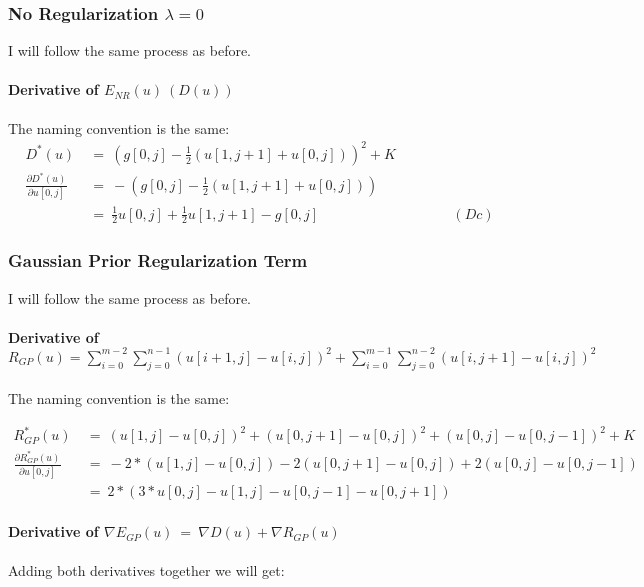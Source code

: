 \documentclass{report}
\begin{document}
			\subsubsection{No Regularization $\lambda = 0$}
			\startsubsection
				I will follow the same process as before.
				\vspace{-0.4cm} \paragraph{Derivative of  $E_{NR}(u) \ (D(u))$}
				\startsubsection
					The naming convention is the same:
					\vspace{-0.2cm}
					\begin{align*}
						D^*(u) \ & = \ (g[0,j] - \frac{1}{2} (u[1,j+1] + u[0,j]))^2 + K \\
						\frac{\partial D^*(u)}{\partial u[0,j]} \ & = \ - (g[0,j] - \frac{1}{2} (u[1,j+1] + u[0,j])) \\
						& = \ \frac{1}{2} u[0,j]  + \frac{1}{2} u[1,j+1] - g[0,j] \hspace{4cm} (Dc)
					\end{align*}
				\closesection
			\closesection
			\subsubsection{Gaussian Prior Regularization Term}
			\startsubsection
				I will follow the same process as before.
				\vspace{-0.4cm} \paragraph{Derivative of $R_{GP}(u) = \sum_{i=0}^{m-2} \sum_{j=0}^{n-1} ( u[i+1,j] - u[i,j] )^2 + \sum_{i=0}^{m-1} \sum_{j=0}^{n-2} ( u[i,j+1] - u[i,j] )^2$}
				\startsubsection
					\vspace{0.2cm} The naming convention is the same:
				\closesection
				\begin{adjustwidth}{-4em}{}
					\vspace{-0.5cm}
					\begin{align*}
						R_{GP}^*(u) \ & = \ (u[1,j] - u[0,j])^2 + (u[0,j+1] - u[0,j])^2 + (u[0,j] - u[0,j-1])^2 + K \\
						\frac{\partial R_{GP}^*(u)}{\partial u[0,j]} \ & = \ -2 * (u[1,j] - u[0,j]) - 2 (u[0,j+1] - u[0,j]) + 2 (u[0,j] - u[0,j-1]) \\
						& = \ 2 * (3 * u[0,j] - u[1,j] - u[0,j-1] - u[0,j+1])
					\end{align*}
				\end{adjustwidth}
				\vspace{-0.4cm} \paragraph{Derivative of $\nabla E_{GP}(u) \ = \ \nabla D(u) + \nabla R_{GP}(u)$}
				\startsubsection
					Adding both derivatives together we will get:
				\closesection
			\closesection
\end{document}
